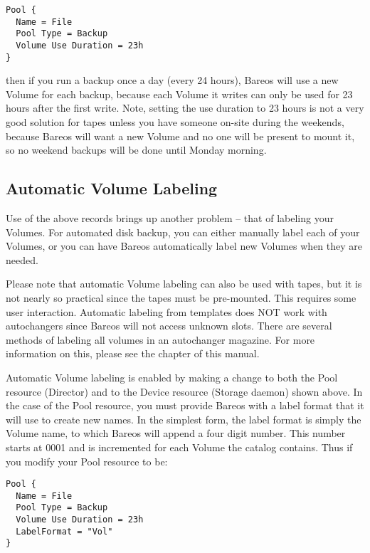 \footnotesize
\begin{verbatim}
Pool {
  Name = File
  Pool Type = Backup
  Volume Use Duration = 23h
}
\end{verbatim}
\normalsize

then if you run a backup once a day (every 24 hours), Bareos will use a new
Volume for each backup, because each Volume it writes can only be used for 23 hours
after the first write. Note, setting the use duration to 23 hours is not a very
good solution for tapes unless you have someone on-site during the weekends,
because Bareos will want a new Volume and no one will be present to mount it,
so no weekend backups will be done until Monday morning.

\label{AutomaticLabeling}
\subsection{Automatic Volume Labeling}

Use of the above records brings up another problem -- that of labeling your
Volumes. For automated disk backup, you can either manually label each of your
Volumes, or you can have Bareos automatically label new Volumes when they are
needed.

Please note that automatic Volume labeling can also be used with tapes, but
it is not nearly so practical since the tapes must be pre-mounted.  This
requires some user interaction.  Automatic labeling from templates does NOT
work with autochangers since Bareos will not access unknown slots.  There
are several methods of labeling all volumes in an autochanger magazine.
For more information on this, please see the  chapter of this manual.

Automatic Volume labeling is enabled by making a change to both the Pool
resource (Director) and to the Device resource (Storage daemon) shown above.
In the case of the Pool resource, you must provide Bareos with a label format
that it will use to create new names. In the simplest form, the label format
is simply the Volume name, to which Bareos will append a four digit number.
This number starts at 0001 and is incremented for each Volume the catalog
contains. Thus if you modify your Pool resource to be:

\footnotesize
\begin{verbatim}
Pool {
  Name = File
  Pool Type = Backup
  Volume Use Duration = 23h
  LabelFormat = "Vol"
}
\end{verbatim}
\normalsize

